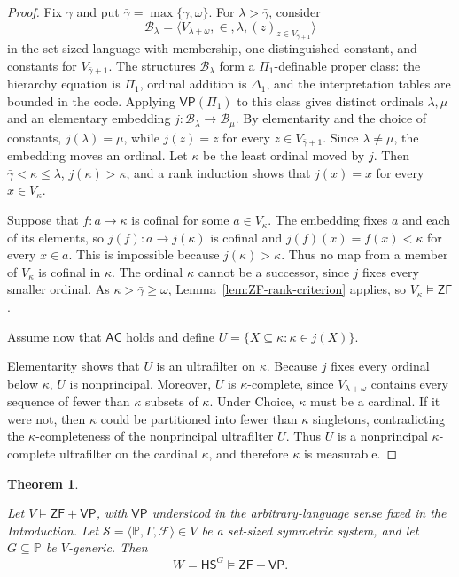 \documentclass[11pt,a4paper]{amsart}
\newcommand{\VP}{\mathsf{VP}}
\newcommand{\AC}{\mathsf{AC}}
\newcommand{\ZF}{\mathsf{ZF}}
\newcommand{\HS}{\mathsf{HS}}
\theoremstyle{plain}
\newtheorem{theorem}{Theorem}[section]
\theoremstyle{definition}
\theoremstyle{remark}
\begin{document}
\begin{proof}

Fix $\gamma$ and put $\bar\gamma=\max\{\gamma,\omega\}$.  For $\lambda>\bar\gamma$, consider
\[
\mathcal B_\lambda=\bigl\langle V_{\lambda+\omega},\in,\lambda,
(z)_{z\in V_{\bar\gamma+1}}\bigr\rangle
\]
 in the set-sized language with membership, one distinguished constant, and constants for $V_{\bar\gamma+1}$.  {\color{auditgreen}The structures $\mathcal B_\lambda$ form a $\Pi_1$-definable proper class: the hierarchy equation is $\Pi_1$, ordinal addition is $\Delta_1$, and the interpretation tables are bounded in the code.  Applying $\VP(\Pi_1)$ to this class} gives distinct ordinals $\lambda,\mu$ and an elementary embedding $j:\mathcal B_\lambda\longrightarrow\mathcal B_\mu$.
By elementarity and the choice of constants, $j(\lambda)=\mu$, while $j(z)=z$ for every $z\in V_{\bar\gamma+1}$.  Since $\lambda\ne\mu$, the embedding moves an ordinal.  Let $\kappa$ be the least ordinal moved by $j$.  Then $\bar\gamma<\kappa\leq\lambda$, $j(\kappa)>\kappa$, and a rank induction shows that $j(x)=x$ for every $x\in V_\kappa$.

 Suppose that $f:a\to\kappa$ is cofinal for some $a\in V_\kappa$.  The embedding fixes $a$ and each of its elements, so $j(f):a\to j(\kappa)$ is cofinal and $j(f)(x)=f(x)<\kappa$ for every $x\in a$.  This is impossible because $j(\kappa)>\kappa$.  Thus no map from a member of $V_\kappa$ is cofinal in $\kappa$.  The ordinal $\kappa$ cannot be a successor, since $j$ fixes every smaller ordinal.  As $\kappa>\bar\gamma\geq\omega$, Lemma~\ref{lem:ZF-rank-criterion} applies, so $V_\kappa\models\ZF$.

Assume now that $\AC$ holds and define $U=\{X\subseteq\kappa:\kappa\in j(X)\}$.

Elementarity shows that $U$ is an ultrafilter on $\kappa$.  Because $j$ fixes every ordinal below $\kappa$, $U$ is nonprincipal.  Moreover, $U$ is $\kappa$-complete, since $V_{\lambda+\omega}$ contains every sequence of fewer than $\kappa$ subsets of $\kappa$.  Under Choice, $\kappa$ must be a cardinal.  If it were not, then $\kappa$ could be partitioned into fewer than $\kappa$ singletons, contradicting the $\kappa$-completeness of the nonprincipal ultrafilter $U$.  Thus $U$ is a nonprincipal $\kappa$-complete ultrafilter on the cardinal $\kappa$, and therefore $\kappa$ is measurable.
\end{proof}

\begin{theorem}\label{thm:preservation}

Let $V\models\ZF+\VP$, with $\VP$ understood in the arbitrary-language sense fixed in the Introduction.  Let $\mathscr S=\langle\mathbb P,\Gamma,\mathcal F\rangle\in V$ be a set-sized symmetric system, and let $G\subseteq\mathbb P$ be $V$-generic.  Then
\[
W=\HS^G\models\ZF+\VP.
\]
\end{theorem}
\end{document}
